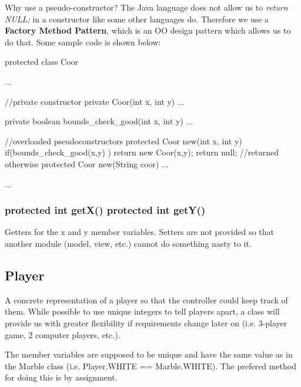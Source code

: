 \documentclass{article}
\begin{document}
Why use a pseudo-constructor? The Java language does not allow us to \textit{return NULL;} in a constructor like some other languages do. Therefore we use a \textbf{Factory Method Pattern}, which is an OO design pattern which allows us to do that. Some sample code is shown below:

\begin{verbatimtab}
protected class Coor
{
	...

	//private constructor
	private Coor(int x, int y)
	{
		...
	}

	private boolean bounds\_check\_good(int x, int y)
	{
		...
	}

	//overloaded pseudoconstructors
	protected Coor new(int x, int y)
	{
		if(bounds\_check\_good(x,y) ) return new Coor(x,y);
		return null; //returned otherwise
	}
	protected Coor new(String coor)
	{
		...
	}

	...
}
\end{verbatimtab}

\subsubsection*{protected int getX() protected int getY()}
Getters for the x and y member variables. Setters are not provided so that another module (model, view, etc.) cannot do something nasty to it.

\subsection{Player}
A concrete representation of a player so that the controller could keep track of them. While possible to use unique integers to tell players apart, a class will provide us with greater flexibility if requirements change later on (i.e. 3-player game, 2 computer players, etc.).


The member variables are supposed to be unique and have the same value as in the Marble class (i.e. Player.WHITE == Marble.WHITE). The prefered method for doing this is by assignment.
\end{document}

